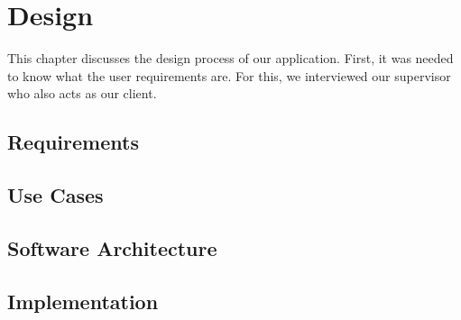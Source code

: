 \chapter{Design}
This chapter discusses the design process of our application. First, it was needed to know what the user requirements are. For this, we interviewed our supervisor who also acts as our client.

\section{Requirements}

\section{Use Cases}

\section{Software Architecture}

\section{Implementation}